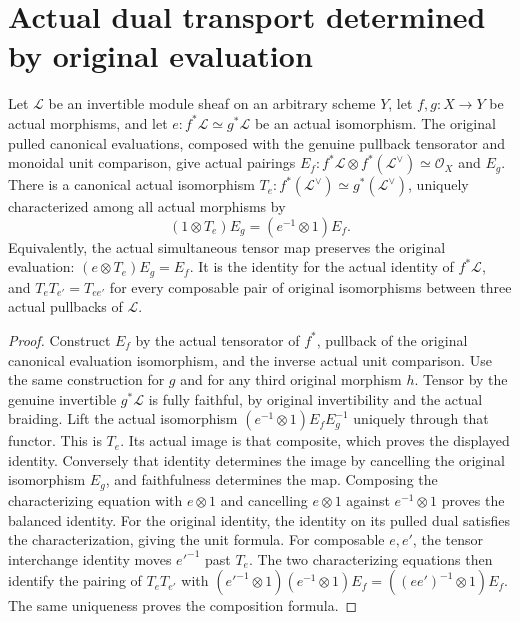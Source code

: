 \section{Actual dual transport determined by original evaluation}

\begin{lemma}
\label{lem:cartier-actual-evaluation-dual-transport}
\leanok
Let $\mathcal L$ be an invertible module sheaf on an arbitrary scheme
$Y$, let $f,g:X\to Y$ be actual morphisms, and let
$e:f^*\mathcal L\simeq g^*\mathcal L$ be an actual isomorphism.
The original pulled canonical evaluations, composed with the genuine
pullback tensorator and monoidal unit comparison, give actual pairings
$E_f:f^*\mathcal L\otimes f^*(\mathcal L^\vee)\simeq\mathcal O_X$
and $E_g$.
There is a canonical actual isomorphism
$T_e:f^*(\mathcal L^\vee)\simeq g^*(\mathcal L^\vee)$, uniquely
characterized among all actual morphisms by
\[
 (1\otimes T_e)E_g=(e^{-1}\otimes1)E_f.
\]
Equivalently, the actual simultaneous tensor map preserves the original
evaluation: $(e\otimes T_e)E_g=E_f$.
It is the identity for the actual identity of $f^*\mathcal L$, and
$T_eT_{e'}=T_{ee'}$ for every composable pair of original isomorphisms
between three actual pullbacks of $\mathcal L$.
\end{lemma}
\begin{proof}
Construct $E_f$ by the actual tensorator of $f^*$, pullback of the
original canonical evaluation isomorphism, and the inverse actual
unit comparison. Use the same construction for $g$ and for any third
original morphism $h$. Tensor by the genuine invertible $g^*\mathcal L$
is fully faithful, by original invertibility and the actual braiding.
Lift the actual isomorphism
$(e^{-1}\otimes1)E_fE_g^{-1}$ uniquely through that functor. This is
$T_e$. Its actual image is that composite, which proves the displayed
identity. Conversely that identity determines the image by cancelling
the original isomorphism $E_g$, and faithfulness determines the map.
Composing the characterizing equation with $e\otimes1$ and cancelling
$e\otimes1$ against $e^{-1}\otimes1$ proves the balanced identity.
For the original identity, the identity on its pulled dual satisfies
the characterization, giving the unit formula. For composable $e,e'$,
the tensor interchange identity moves $e'^{-1}$ past $T_e$.
The two characterizing equations then identify the pairing of
$T_eT_{e'}$ with
$(e'^{-1}\otimes1)(e^{-1}\otimes1)E_f=((ee')^{-1}\otimes1)E_f$.
The same uniqueness proves the composition formula.
\end{proof}
